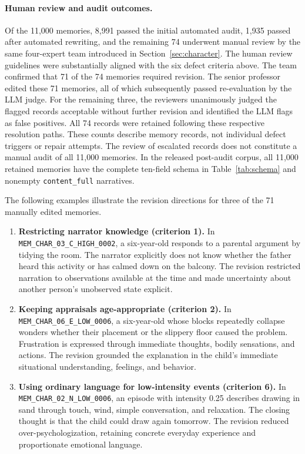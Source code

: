 \documentclass[11pt]{article}
\begin{document}
\paragraph{Human review and audit outcomes.}
Of the 11{,}000 memories, 8{,}991 passed the initial automated audit, 1{,}935 passed after automated rewriting, and the remaining 74 underwent manual review by the same four-expert team introduced in Section~\ref{sec:character}. The human review guidelines were substantially aligned with the six defect criteria above. The team confirmed that 71 of the 74 memories required revision. The senior professor edited these 71 memories, all of which subsequently passed re-evaluation by the LLM judge. For the remaining three, the reviewers unanimously judged the flagged records acceptable without further revision and identified the LLM flags as false positives. All 74 records were retained following these respective resolution paths. These counts describe memory records, not individual defect triggers or repair attempts. The review of escalated records does not constitute a manual audit of all 11{,}000 memories. In the released post-audit corpus, all 11{,}000 retained memories have the complete ten-field schema in Table~\ref{tab:schema} and nonempty \texttt{content\_full} narratives.

The following examples illustrate the revision directions for three of the 71 manually edited memories.
\begin{enumerate}[leftmargin=1.5em, itemsep=4pt]
  \item \textbf{Restricting narrator knowledge (criterion 1).} In \texttt{MEM\_CHAR\_03\_C\_HIGH\_0002}, a six-year-old responds to a parental argument by tidying the room. The narrator explicitly does not know whether the father heard this activity or has calmed down on the balcony. The revision restricted narration to observations available at the time and made uncertainty about another person's unobserved state explicit.
  \item \textbf{Keeping appraisals age-appropriate (criterion 2).} In \texttt{MEM\_CHAR\_06\_E\_LOW\_0006}, a six-year-old whose blocks repeatedly collapse wonders whether their placement or the slippery floor caused the problem. Frustration is expressed through immediate thoughts, bodily sensations, and actions. The revision grounded the explanation in the child's immediate situational understanding, feelings, and behavior.
  \item \textbf{Using ordinary language for low-intensity events (criterion 6).} In \texttt{MEM\_CHAR\_02\_N\_LOW\_0006}, an episode with intensity 0.25 describes drawing in sand through touch, wind, simple conversation, and relaxation. The closing thought is that the child could draw again tomorrow. The revision reduced over-psychologization, retaining concrete everyday experience and proportionate emotional language.
\end{enumerate}
\end{document}
